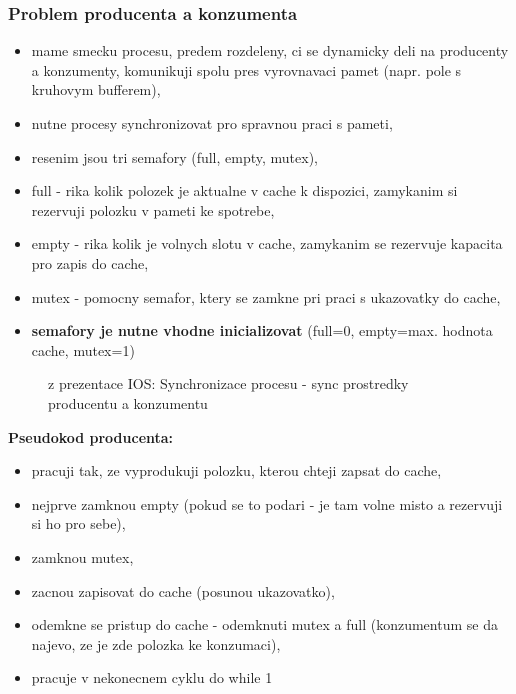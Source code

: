 \documentclass[a4paper, 11pt]{article}
\begin{document}
\subsubsection{Problem producenta a konzumenta}
\begin{itemize}
    \item mame smecku procesu, predem rozdeleny, ci se dynamicky deli na producenty a konzumenty, komunikuji spolu pres vyrovnavaci pamet (napr. pole s kruhovym bufferem),
    \item nutne procesy synchronizovat pro spravnou praci s pameti,
    \item resenim jsou tri semafory (full, empty, mutex),
    \item full - rika kolik polozek je aktualne v cache k dispozici, zamykanim si rezervuji polozku v pameti ke spotrebe,
    \item empty - rika kolik je volnych slotu v cache, zamykanim se rezervuje kapacita pro zapis do cache,
    \item mutex - pomocny semafor, ktery se zamkne pri praci s ukazovatky do cache,
    \item \textbf{semafory je nutne vhodne inicializovat} (full=0, empty=max. hodnota cache, mutex=1) \\
\end{itemize}

\begin{figure} [h]
    \centering
    \caption{z prezentace IOS: Synchronizace procesu - sync prostredky producentu a konzumentu}
\end{figure}

\newpage

\textbf{Pseudokod producenta:}
\begin{itemize}
    \item pracuji tak, ze vyprodukuji polozku, kterou chteji zapsat do cache,
    \item nejprve zamknou empty (pokud se to podari - je tam volne misto a rezervuji si ho pro sebe),
    \item zamknou mutex,
    \item zacnou zapisovat do cache (posunou ukazovatko),
    \item odemkne se pristup do cache - odemknuti mutex a full (konzumentum se da najevo, ze je zde polozka ke konzumaci),
    \item pracuje v nekonecnem cyklu do while 1 \\
\end{itemize}
\end{document}
